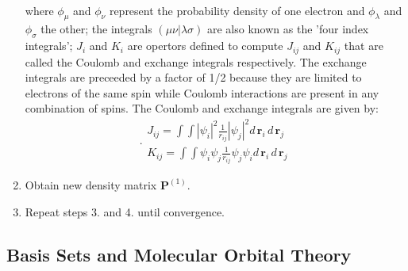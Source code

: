 \begin{enumerate}
\begin{equation}
\begin{aligned}
                        \end{aligned}
                    \end{equation}
                    where $\phi_\mu$ and $\phi_\nu$ represent the probability density of one electron and $\phi_\lambda$ and $\phi_\sigma$ the other; the integrals $(\mu \nu | \lambda \sigma)$ are also known as the 'four index integrals'; $J_i$ and $K_i$ are opertors defined to compute $J_{ij}$ and $K_{ij}$ that are called the Coulomb and exchange integrals respectively. The exchange integrals are preceeded by a factor of 1/2 because they are limited to electrons of the same spin while Coulomb interactions are present in any combination of spins. The Coulomb and exchange integrals are given by:
                    \begin{equation}\label{eq:Coulomb and exchange integrals}.
                        \begin{aligned}
                            J_{ij} = \displaystyle\int \int |\psi_i|^2 \frac{1}{r_{ij}} |\psi_j|^2 d\,\mathbf{r}_i\, d\,\mathbf{r}_j\\
                            K_{ij} = \displaystyle\int \int \psi_i \psi_j \frac{1}{r_{ij}} \psi_j \psi_i d\,\mathbf{r}_i\, d\,\mathbf{r}_j
                        \end{aligned}
                    \end{equation}
                     
                \item Obtain new density matrix $\mathbf{P}^{(1)}$.
                \item Repeat steps 3. and 4. until convergence.
            \end{enumerate}

        \subsection{Basis Sets and Molecular Orbital Theory}


